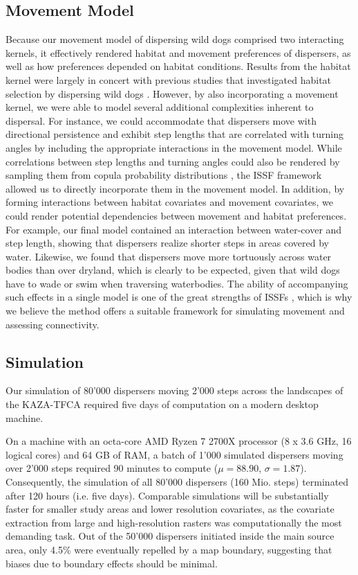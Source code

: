 \documentclass[abstract=on,10pt,a4paper,bibliography=totocnumbered]{article}
\begin{document}
\subsection{Movement Model}
Because our movement model of dispersing wild dogs comprised two interacting
kernels, it effectively rendered habitat and movement preferences of dispersers,
as well as how preferences depended on habitat conditions. Results from the
habitat kernel were largely in concert with previous studies that investigated
habitat selection by dispersing wild dogs \citep{DaviesMostert.2012,
Masenga.2016, Woodroffe.2019, Oneill.2020, Hofmann.2021}. However, by also
incorporating a movement kernel, we were able to model several additional
complexities inherent to dispersal. For instance, we could accommodate that
dispersers move with directional persistence \citep{Cozzi.2018, Hofmann.2021}
and exhibit step lengths that are correlated with turning angles
\citep{Morales.2004, Borger.2012} by including the appropriate interactions in
the movement model. While correlations between step lengths and turning angles
could also be rendered by sampling them from copula probability distributions
\citep{Hodel.2021a, Hodel.2021b}, the ISSF framework allowed us to directly
incorporate them in the movement model. In addition, by forming interactions
between habitat covariates and movement covariates, we could render potential
dependencies between movement and habitat preferences. For example, our final
model contained an interaction between water-cover and step length, showing that
dispersers realize shorter steps in areas covered by water. Likewise, we found
that dispersers move more tortuously across water bodies than over dryland,
which is clearly to be expected, given that wild dogs have to wade or swim when
traversing waterbodies. The ability of accompanying such effects in a single
model is one of the great strengths of ISSFs \citep{Avgar.2016, Fieberg.2021},
which is why we believe the method offers a suitable framework for simulating
movement and assessing connectivity.

\subsection{Simulation}
Our simulation of 80'000 dispersers moving 2'000 steps across the landscapes of
the KAZA-TFCA required five days of computation on a modern desktop machine.

On a machine with an octa-core AMD Ryzen 7 2700X processor (8 x 3.6 GHz, 16
logical cores) and 64 GB of RAM, a batch of 1'000 simulated dispersers moving
over 2'000 steps required 90 minutes to compute (\(\mu = 88.90\), \(\sigma =
1.87\)). Consequently, the simulation of all 80'000 dispersers (160 Mio. steps)
terminated after 120 hours (i.e. five days). Comparable simulations will be
substantially faster for smaller study areas and lower resolution covariates, as
the covariate extraction from large and high-resolution rasters was
computationally the most demanding task. Out of the 50'000 dispersers initiated
inside the main source area, only 4.5\% were eventually repelled by a map
boundary, suggesting that biases due to boundary effects should be minimal.
\end{document}
